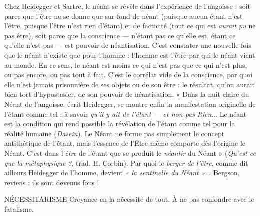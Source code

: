 Chez Heidegger et Sartre, le néant se révèle dans l’expérience de l’angoisse :
soit parce que l’être ne se donne que sur fond de néant (puisque aucun étant
n’est l’être, puisque l’être n’est rien d’étant) et de facticité (tout ce qui est {\it aurait
pu} ne pas être), soit parce que la conscience — n’étant pas ce qu’elle est, étant ce
qu’elle n’est pas — est pouvoir de néantisation. C’est constater une nouvelle fois
que le néant n’existe que pour l’homme : l’homme est l'être par qui le néant
vient au monde. En ce sens, le néant est moins ce qui n’est pas que ce qui n’est
plus, ou pas encore, ou pas tout à fait. C’est le corrélat vide de la conscience,
par quoi elle n’est jamais prisonnière de ses objets ou de son être : le résultat,
qu’on aurait bien tort d’hypostasier, de son pouvoir de néantisation. « Dans la
nuit claire du Néant de l’angoisse, écrit Heidegger, se montre enfin la manifestation
originelle de l’étant comme tel : à savoir {\it qu'il y ait de l'étant — et non pas
Rien}... Le néant est la condition qui rend possible la révélation de l’étant
comme tel pour la réalité humaine ({\it Dasein}). Le Néant ne forme pas simplement
le concept antithétique de l’étant, mais l'essence de l’Être même comporte
dès l’origine le Néant. C’est dans l’{\it être} de l’étant que se produit le {\it néantir}
du Néant » ({\it Qu'est-ce que la métaphysique ?}, trad. H. Corbin). Par quoi le {\it berger
de l'être}, comme dit ailleurs Heidegger de l’homme, devient {\it « la sentinelle du
Néant »}... Bergson, reviens : ils sont devenus fous !

NÉCESSITARISME Croyance en la nécessité de tout. À ne pas confondre
avec le fatalisme.

